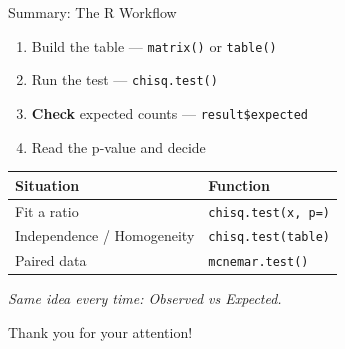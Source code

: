 \documentclass{beamer}					%
\begin{document}
\begin{frame}[fragile]{Summary: The R Workflow}
\small
\begin{enumerate}
    \item Build the table --- \texttt{matrix()} or \texttt{table()}
    \item Run the test --- \texttt{chisq.test()}
    \item \textbf{Check} expected counts --- \texttt{result\$expected}
    \item Read the p-value and decide
\end{enumerate}
 
\vspace{1em}
\begin{center}
\begin{tabular}{ll}
\toprule
\textbf{Situation} & \textbf{Function} \\
\midrule
Fit a ratio & \texttt{chisq.test(x, p=)} \\
Independence / Homogeneity & \texttt{chisq.test(table)} \\
Paired data & \texttt{mcnemar.test()} \\
\bottomrule
\end{tabular}
\end{center}
 
\vspace{0.8em}
\centering \textit{Same idea every time: Observed vs Expected.}
 
\end{frame}
 
\begin{frame}{}    
    \begin{center}
    \Large Thank you for your attention!
    \end{center}
\end{frame}
 
\end{document}
